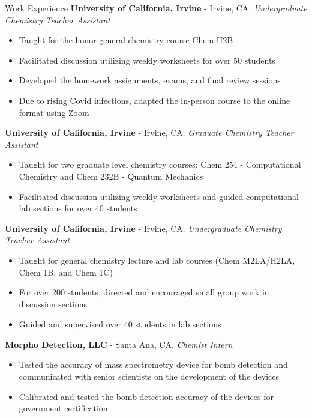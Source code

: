 \begin{rubric}{Work Experience}
  \textbf{University of California, Irvine} - Irvine, CA.
  \textit{Undergraduate Chemistry Teacher Assistant}
  \vspace{-0.5em}
  \begin{itemize}
    \itemsep-0.5em
  \item Taught for the honor general chemistry course Chem H2B 
  \item Facilitated discussion utilizing weekly worksheets
    for over 50 students
  \item Developed the homework assignments, exams, and final
    review sessions
  \item Due to rising Covid infections, adapted the in-person
    course to the online format using Zoom
  \vspace{-1em}
  \end{itemize}
%
  \textbf{University of California, Irvine} - Irvine, CA.
  \textit{Graduate Chemistry Teacher Assistant}
  \vspace{-0.5em}
  \begin{itemize}
    \itemsep-0.5em
  \item Taught for two graduate level chemistry courses:
    Chem 254 - Computational Chemistry and Chem 232B - Quantum Mechanics
  \item Facilitated discussion utilizing weekly worksheets and guided
    computational lab sections for over 40 students
  \vspace{-1em}
  \end{itemize}
%
  \textbf{University of California, Irvine} - Irvine, CA.
  \textit{Undergraduate Chemistry Teacher Assistant}
  \vspace{-0.5em}
  \begin{itemize}
    \itemsep-0.5em
  \item Taught for general chemistry lecture and lab courses (Chem M2LA/H2LA,
    Chem 1B, and Chem 1C)
  \item For over 200 students, directed and encouraged small group work in
    discussion sections
  \item Guided and supervised over 40 students in lab sections
  \vspace{-1em}
  \end{itemize}
%
  \textbf{Morpho Detection, LLC} - Santa Ana, CA.
  \textit{Chemist Intern}
  \vspace{-0.5em}
  \begin{itemize}
    \itemsep-0.5em
  \item Tested the accuracy of mass spectrometry device for bomb detection and communicated
    with senior scientists on the development of the devices
  \item Calibrated and tested the bomb detection accuracy of the devices for
    government certification
  \vspace{-2em}
  \end{itemize}
%
%
%
\end{rubric}
